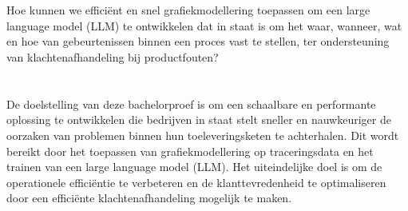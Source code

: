 \section{}%
\label{sec:onderzoeksvraag}

Hoe kunnen we efficiënt en snel grafiekmodellering toepassen om een large language model (LLM) te ontwikkelen dat in staat is om het waar, wanneer, wat en hoe van gebeurtenissen binnen een proces vast te stellen, ter ondersteuning van klachtenafhandeling bij productfouten?

\section{}%
\label{sec:onderzoeksdoelstelling}

De doelstelling van deze bachelorproef is om een schaalbare en performante oplossing te ontwikkelen die bedrijven in staat stelt sneller en nauwkeuriger de oorzaken van problemen binnen hun toeleveringsketen te achterhalen. 
Dit wordt bereikt door het toepassen van grafiekmodellering op traceringsdata en het trainen van een large language model (LLM). 
Het uiteindelijke doel is om de operationele efficiëntie te verbeteren en de klanttevredenheid te optimaliseren door een efficiënte klachtenafhandeling mogelijk te maken.

\section{}%
\label{sec:opzet-bachelorproef}


